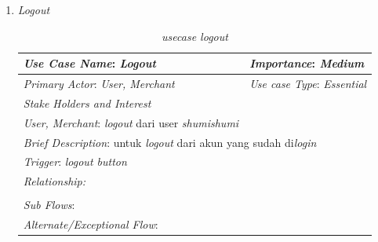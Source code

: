 \documentclass[a4paper]{article}
\begin{document}
\begin{enumerate}
\begin{enumerate}
        \newpage
        \item \textit{Logout}
\begin{table}[h]
    \centering
    \caption{\textit{usecase logout} }
    \begin{tabular}{|lll}
    \hline
    \multicolumn{1}{|l|}{\textit{Use Case Name}: \textit{Logout}}             & \multicolumn{2}{l|}{\textit{Importance}: \textit{Medium}}   \\ \hline
    \multicolumn{1}{|l|}{\textit{Primary Actor}: \textit{User, Merchant}}             & \multicolumn{2}{l|}{\textit{Use case Type}: \textit{Essential}} \\ \hline
    \multicolumn{1}{|l|}{\textit{Stake Holders and Interest}} &                               &                               \\ \cline{1-1}
    \multicolumn{1}{|l|}{\textit{User, Merchant}: \textit{logout} dari user \textit{shumishumi}}                                                     &                               &                               \\ \hline
    \multicolumn{3}{|l|}{\textit{Brief Description}: untuk \textit{logout} dari akun yang sudah di\textit{login}}                                                                         \\ \hline
    \multicolumn{3}{|l|}{\textit{Trigger}: \textit{logout button}}                                                                                   \\ \hline
    \multicolumn{3}{|l|}{\textit{Relationship:}}                                                                              \\ \hline
    \multicolumn{3}{|l|}{}                                                                                                                     \\ \hline
    \multicolumn{3}{|l|}{\textit{Sub Flows}:}                                                                                 \\ \hline
    \multicolumn{3}{|l|}{\textit{Alternate/Exceptional Flow}:}                                                                \\ \hline
    \end{tabular}
\end{table}


\end{enumerate}
\end{enumerate}
\end{document}
